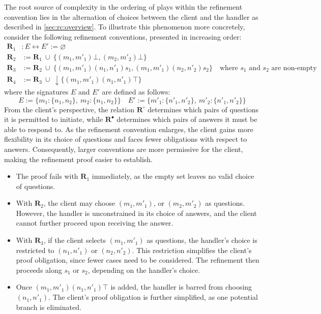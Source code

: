 The root source of complexity
in the ordering of plays within the refinement convention lies in
the alternation of choices
between the client and the handler
as described in \autoref{sec:rc:overview}.
To illustrate this phenomenon more concretely,
consider the following refinement conventions,
presented in increasing order:
\begin{align*}
  \mathbf{R}_1 & : E \leftrightarrow E' := \varnothing \\
  \mathbf{R}_2 & := \mathbf{R}_1\ \cup\ \{(m_1, m'_1)\bot, (m_2, m'_2)\bot\} \\
  \mathbf{R}_3 & := \mathbf{R}_2\ \cup\ \{(m_1, m'_1)(n_1, n'_1)s_1, (m_1, m'_1)(n_2, n'_2)s_2\}\quad \text{where $s_1$ and $s_2$ are non-empty}  \\
  \mathbf{R}_4 & := \mathbf{R}_3\ \cup\ \downarrow\{(m_1, m'_1)(n_1, n'_1)\top\}
\end{align*}
where the signatures $E$ and $E'$ are defined as follows:
\[
  E  := \{ m_1 : \{n_1, n_2\},\ m_2 : \{ n_1, n_2 \} \} \quad
  E' := \{ m'_1 : \{n'_1, n'_2\},\ m'_2 : \{ n'_1, n'_2 \} \}
\]
From the client's perspective,
the relation $\mathbf{R}^\circ$ determines
which pairs of questions
it is permitted to initiate,
while $\mathbf{R}^\bullet$ determines
which pairs of answers it must be able to respond to.
As the refinement convention enlarges,
the client gains more flexibility in its choice of questions
and faces fewer obligations with respect to answers.
Consequently, larger conventions are more permissive for the client,
making the refinement proof easier to establish.

\begin{itemize}
  \item The proof fails with $\mathbf{R}_1$
    immediately,
    as the empty set leaves no valid choice of questions.
  \item With $\mathbf{R}_2$,
    the client may choose $(m_1, m'_1)$, or $(m_2, m'_2)$
    as questions.
    However, the handler is unconstrained
    in its choice of answers,
    and the client cannot further proceed
    upon receiving the answer.
  \item With $\mathbf{R}_3$,
    if the client selects $(m_1, m'_1)$ as questions,
    the handler's choice is restricted to $(n_1, n'_1)$ or $(n_2, n'_2)$.
    This restriction simplifies the client's proof obligation,
    since fewer cases need to be considered.
    The refinement then proceeds along $s_1$ or $s_2$,
    depending on the handler's choice.
  \item Once
    $(m_1, m'_1)(n_1, n'_1) \top$ is added,
    the handler is barred from choosing $(n_1, n'_1)$.
    The client's proof obligation is further simplified,
    as one potential branch is eliminated.
\end{itemize}

